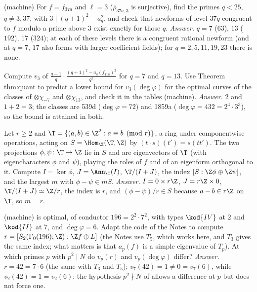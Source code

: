 \begin{exercise}\label{exer:modgalrep:raising-37}
(machine) For $f=f_{37a}$ and $\ell=3$ ($\bar\rho_{37a,3}$ is surjective), find the primes $q<25$, $q\ne3,37$, with $3\mid(q+1)^2-a_q^2$, and check that newforms of level $37q$ congruent to $f$
modulo a prime above $3$ exist exactly for those $q$. \emph{Answer.} $q=7$ ($63$), $13$ ($192$), $17$ ($324$); at each of these levels there is a congruent rational newform (and
at $q=7$, $17$ also forms with larger coefficient fields); for $q=2,5,11,19,23$ there is none.
\end{exercise}

\begin{exercise}[the level-raising factor at $\ell=3$]\label{exer:modgalrep:factor-11}
Compute $v_3$ of $\frac{q-1}q\cdot\frac{(q+1)^2-a_q(f_{11a})^2}{q^2}$ for $q=7$ and $q=13$. Use Theorem thm:quant to predict a lower bound for $v_3(\deg\varphi)$ for the optimal curves of the classes of
$\otimes\chi_{-7}$ and $\otimes\chi_{13}$, and check it in the tables (machine). \emph{Answer.} $2$ and $1+2=3$; the classes are 539d ($\deg\varphi=72$) and 1859a
($\deg\varphi=432=2^4\cdot3^3$), so the bound is attained in both.
\end{exercise}

\begin{exercise}\label{exer:modgalrep:toy}
Let $r\ge2$ and $\T=\{(a,b)\in\Z^2:a\equiv b\pmod r\}$, a ring under componentwise operations, acting on $S=\Hom_\Z(\T,\Z)$ by $(t\cdot s)(t')=s(tt')$. The two projections $\phi,\psi\colon\T\to\Z$
lie in $S$ and are eigenvectors of $\T$ (with eigencharacters $\phi$ and $\psi$), playing the roles of $f$ and of an eigenform orthogonal to it. Compute $I=\ker\phi$, $J=\Ann_\T(I)$,
$\T/(I+J)$, the index $[S:\Z\phi\oplus\Z\psi]$, and the largest $m$ with $\phi-\psi\in mS$. \emph{Answer.} $I=0\times r\Z$, $J=r\Z\times0$, $\T/(I+J)\simeq\Z/r$, the index is $r$, and $(\phi-\psi)/r\in S$ because
$a-b\in r\Z$ on $\T$, so $m=r$.
\end{exercise}

\begin{exercise}\label{exer:modgalrep:196a1}
(machine)  is optimal, of conductor $196=2^2\cdot7^2$, with types $\kod{IV}$ at $2$ and $\kod{II}$ at $7$, and $\deg\varphi=6$. Adapt the code of the Notes to compute
$r=[S_2(\Gamma_0(196);\Z):\Z f\oplus L]$ (the Notes use $T_5$, which works here, and $T_3$ gives the same index; what matters is that $a_p(f)$ is a simple eigenvalue of $T_p$). At which primes $p$ with $p^2\mid N$ do $v_p(r)$
and $v_p(\deg\varphi)$ differ? \emph{Answer.} $r=42=7\cdot6$ (the same with $T_3$ and $T_5$); $v_7(42)=1\ne0=v_7(6)$, while $v_2(42)=1=v_2(6)$: the hypothesis $p^2\nmid N$ of
 allows a difference at $p$ but does not force one.
\end{exercise}

